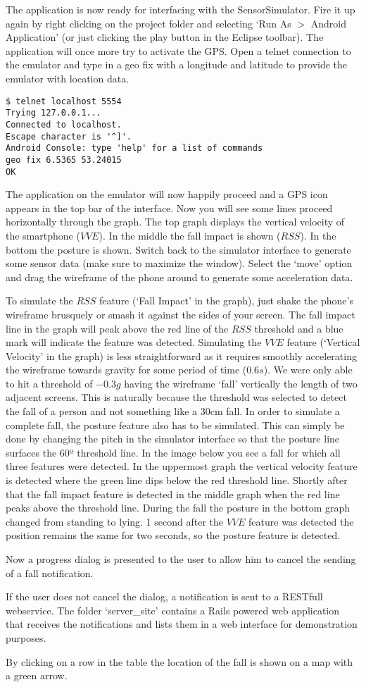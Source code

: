\documentclass[a4paper, 10pt]{article}
\newcommand{\image}[3][\textwidth]{%
  \begin{figure}[H]%
    \centering%
    \setlength\fboxsep{0pt}\fbox{\texttt{[image: \#2]}}%
    \ifthenelse{\isempty{#3}}%
      {}%
      {\caption{{#3}}}%
    \label{fig:{#2}}%
  \end{figure}
}
\begin{document}
The application is now ready for interfacing with the SensorSimulator. Fire it up again by right clicking on the project folder and selecting `Run As $>$ Android Application' (or just clicking the play button in the Eclipse toolbar). The application will once more try to activate the GPS. Open a telnet connection to the emulator and type in a geo fix with a longitude and latitude to provide the emulator with location data.
\begin{lstlisting}
$ telnet localhost 5554
Trying 127.0.0.1...
Connected to localhost.
Escape character is '^]'.
Android Console: type 'help' for a list of commands
geo fix 6.5365 53.24015
OK
\end{lstlisting}
The application on the emulator will now happily proceed and a GPS icon appears in the top bar of the interface. Now you will see some lines proceed horizontally through the graph. The top graph displays the vertical velocity of the smartphone ($VVE$). In the middle the fall impact is shown ($RSS$). In the bottom the posture is shown. Switch back to the simulator interface to generate some sensor data (make sure to maximize the window). Select the `move' option and drag the wireframe of the phone around to generate some acceleration data.
\image{simulator.png}{}
To simulate the $RSS$ feature (`Fall Impact' in the graph), just shake the phone's wireframe brusquely or smash it against the sides of your screen. The fall impact line in the graph will peak above the red line of the $RSS$ threshold and a blue mark will indicate the feature was detected. Simulating the $VVE$ feature (`Vertical Velocity' in the graph) is less straightforward as it requires smoothly accelerating the wireframe towards gravity for some period of time ($0.6s$). We were only able to hit a threshold of $-0.3g$ having the wireframe `fall' vertically the length of two adjacent screens. This is naturally because the threshold was selected to detect the fall of a person and not something like a 30cm fall. In order to simulate a complete fall, the posture feature also has to be simulated. This can simply be done by changing the pitch in the simulator interface so that the posture line surfaces the 60º threshold line. 
\newpage
In the image below you see a fall for which all three features were detected. In the uppermost graph the vertical velocity feature is detected where the green line dips below the red threshold line. Shortly after that the fall impact feature is detected in the middle graph when the red line peaks above the threshold line. During the fall the posture in the bottom graph changed from standing to lying. 1 second after the $VVE$ feature was detected the position remains the same for two seconds, so the posture feature is detected.
\image{fall_detected.png}{}
Now a progress dialog is presented to the user to allow him to cancel the sending of a fall notification.
\image{sending_notification.png}{}
\newpage
If the user does not cancel the dialog, a notification is sent to a RESTfull webservice. The folder `server\_site' contains a Rails powered web application that receives the notifications and lists them in a web interface for demonstration purposes. 
\image{server_site.png}{}
By clicking on a row in the table the location of the fall is shown on a map with a green arrow.
\image{map.png}{}
\end{document}

